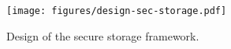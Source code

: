 \begin{figure}[t]
	\centering
	\texttt{[image: figures/design-sec-storage.pdf]}
	\caption{\label{fig:design-sec-storage} Design of the secure storage framework.}
\end{figure}